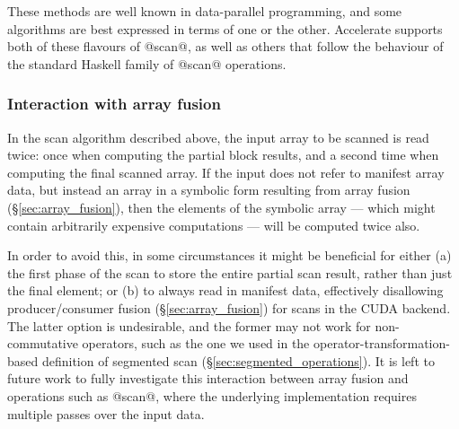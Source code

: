 These methods are well known in data-parallel programming, and some algorithms
are best expressed in terms of one or the other. Accelerate supports both of
these flavours of @scan@, as well as others that follow the behaviour of the
standard Haskell family of @scan@ operations.



\subsubsection{Interaction with array fusion}

In the scan algorithm described above, the input array to be scanned is read
twice: once when computing the partial block results, and a second time when
computing the final scanned array. If the input does not refer to manifest array
data, but instead an array in a symbolic form resulting from array
fusion\fusion{} (\S\ref{sec:array_fusion}), then the elements of the symbolic
array --- which might contain arbitrarily expensive computations --- will be
computed twice also.

In order to avoid this, in some circumstances it might be beneficial for either
(a) the first phase of the scan to store the entire partial scan result, rather
than just the final element; or (b) to always read in manifest data, effectively
disallowing producer/consumer fusion\fusion{} (\S\ref{sec:array_fusion}) for
scans in the CUDA\cuda{} backend. The latter option is undesirable, and the
former may not work for non-commutative operators, such as the one we used in
the operator-transformation-based definition of segmented scan
(\S\ref{sec:segmented_operations}).
%
It is left to future work to fully investigate this interaction between array
fusion and operations such as @scan@, where the underlying implementation
requires multiple passes over the input data.




